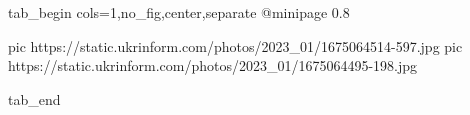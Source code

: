  
 
 
 
 

\ifcmt
	tab_begin cols=1,no_fig,center,separate
		@minipage 0.8

		 pic https://static.ukrinform.com/photos/2023_01/1675064514-597.jpg
		 pic https://static.ukrinform.com/photos/2023_01/1675064495-198.jpg

	tab_end
\fi
